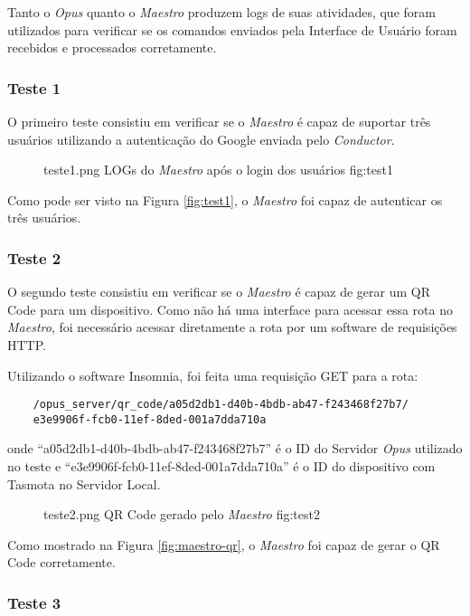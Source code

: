 Tanto o \emph{Opus} quanto o \emph{Maestro} produzem logs de suas atividades, que foram utilizados para verificar se os comandos enviados
pela Interface de Usuário foram recebidos e processados corretamente.

\subsubsection{Teste 1}
O primeiro teste consistiu em verificar se o \emph{Maestro} é capaz de suportar três usuários utilizando a autenticação do Google enviada pelo
\emph{Conductor}.

\begin{figure}[h!]
    {teste1.png}
    {LOGs do \emph{Maestro} após o login dos usuários}
    {fig:test1}
\end{figure}

Como pode ser visto na Figura \ref{fig:test1}, o \emph{Maestro} foi capaz de autenticar os três usuários.

\subsubsection{Teste 2}
O segundo teste consistiu em verificar se o \emph{Maestro} é capaz de gerar um QR Code para um dispositivo. Como não há uma interface para 
acessar essa rota no \emph{Maestro}, foi necessário acessar diretamente a rota por um software de requisições HTTP.

Utilizando o software Insomnia, foi feita uma requisição GET para a rota:
\begin{lstlisting}
    /opus_server/qr_code/a05d2db1-d40b-4bdb-ab47-f243468f27b7/
    e3e9906f-fcb0-11ef-8ded-001a7dda710a
\end{lstlisting}
onde ``a05d2db1-d40b-4bdb-ab47-f243468f27b7'' 
é o ID do Servidor \emph{Opus} utilizado no teste e ``e3e9906f-fcb0-11ef-8ded-001a7dda710a'' é o ID do dispositivo com Tasmota no Servidor Local.

\begin{figure}[h!]
    {teste2.png}
    {QR Code gerado pelo \emph{Maestro}}
    {fig:test2}
\end{figure}

Como mostrado na Figura \ref{fig:maestro-qr}, o \emph{Maestro} foi capaz de gerar o QR Code corretamente.

\subsubsection{Teste 3}

